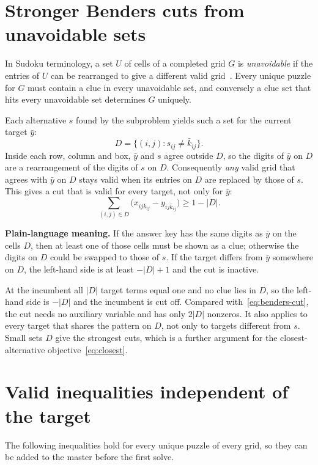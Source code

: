 \documentclass[11pt]{article}
\newcommand{\clue}{x}
\newcommand{\target}{y}
\begin{document}
\section{Stronger Benders cuts from unavoidable sets}

In Sudoku terminology, a set $U$ of cells of a completed grid $G$ is \emph{unavoidable} if the entries of $U$ can be rearranged to give a different valid grid~\cite{mcguire}. Every unique puzzle for $G$ must contain a clue in every unavoidable set, and conversely a clue set that hits every unavoidable set determines $G$ uniquely.

Each alternative $s$ found by the subproblem yields such a set for the current target $\bar y$:
\[
D=\{(i,j): s_{ij}\ne\bar k_{ij}\}.
\]
Inside each row, column and box, $\bar y$ and $s$ agree outside $D$, so the digits of $\bar y$ on $D$ are a rearrangement of the digits of $s$ on $D$. Consequently \emph{any} valid grid that agrees with $\bar y$ on $D$ stays valid when its entries on $D$ are replaced by those of $s$. This gives a cut that is valid for every target, not only for $\bar y$:
\begin{equation}
\sum_{(i,j)\in D}\bigl(\clue_{ij\bar k_{ij}}-\target_{ij\bar k_{ij}}\bigr)\ge 1-|D|.
\label{eq:unavoidable-cut}
\end{equation}

\textbf{Plain-language meaning.} If the answer key has the same digits as $\bar y$ on the cells $D$, then at least one of those cells must be shown as a clue; otherwise the digits on $D$ could be swapped to those of $s$. If the target differs from $\bar y$ somewhere on $D$, the left-hand side is at least $-|D|+1$ and the cut is inactive.

At the incumbent all $|D|$ target terms equal one and no clue lies in $D$, so the left-hand side is $-|D|$ and the incumbent is cut off. Compared with~\eqref{eq:benders-cut}, the cut needs no auxiliary variable and has only $2|D|$ nonzeros. It also applies to every target that shares the pattern on $D$, not only to targets different from $s$. Small sets $D$ give the strongest cuts, which is a further argument for the closest-alternative objective~\eqref{eq:closest}.

\section{Valid inequalities independent of the target}

The following inequalities hold for every unique puzzle of every grid, so they can be added to the master before the first solve.
\end{document}

